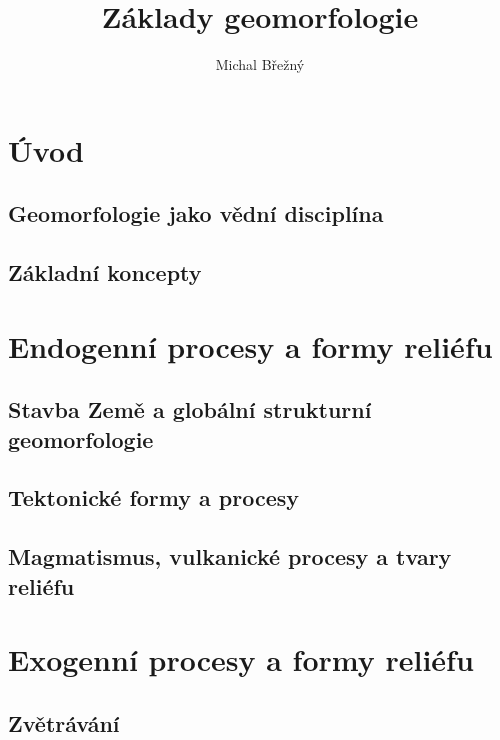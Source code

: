 \documentclass[]{skripta}
\title{Základy geomorfologie}
\author{Michal Břežný}
\begin{document}
		
	\onecolumn
	
	\pagestyle{empty}	
	\clearpage

	\frontmatter

	\pagestyle{fancy}
	 
	
	
	\setcounter{tocdepth}{2}
	\tableofcontents
	
	\mainmatter
	\twocolumn
	\part{Úvod}
	
	\chapter{Geomorfologie jako vědní disciplína}
	
	\chapter{Základní koncepty}
	
	\part{Endogenní procesy a formy reliéfu}
	
	\chapter{Stavba Země a globální strukturní geomorfologie}
	
		
	\chapter{Tektonické formy a procesy}
	

	\chapter{Magmatismus, vulkanické procesy a tvary reliéfu}
	

	\part{Exogenní procesy a formy reliéfu}

	\chapter{Zvětrávání}
	
\end{document}
